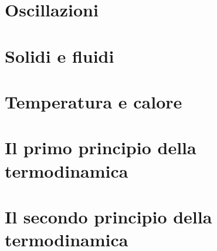 \documentclass[a4paper]{extarticle}
\begin{document}
\newpage
\section{Oscillazioni}

\newpage
\section{Solidi e fluidi}

\newpage
\section{Temperatura e calore}

\newpage
\section{Il primo principio della termodinamica}

\newpage
\section{Il secondo principio della termodinamica}
\end{document}
